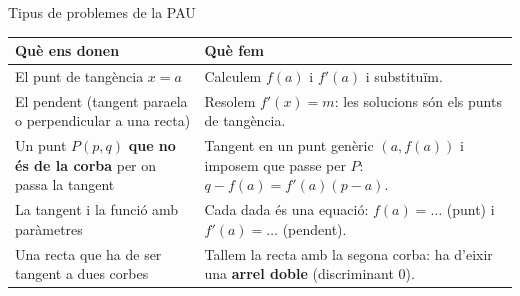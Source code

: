 \documentclass[11pt,a4paper]{article}
\begin{document}
\begin{fmdef}{Tipus de problemes de la PAU}
\begin{center}\renewcommand{\arraystretch}{1.5}\small\begin{tabularx}{\linewidth}{>{\raggedright\arraybackslash}p{5.5cm}>{\raggedright\arraybackslash}X}\toprule
\textbf{Què ens donen} & \textbf{Què fem}\\\midrule
El punt de tangència $x=a$ & Calculem $f(a)$ i $f'(a)$ i substituïm.\\[3pt]
El pendent (tangent para\lgem{}ela o perpendicular a una recta) & Resolem $f'(x)=m$: les solucions són els punts de tangència.\\[3pt]
Un punt $P(p,q)$ \textbf{que no és de la corba} per on passa la tangent & Tangent en un punt genèric $(a,f(a))$ i imposem que passe per $P$: $q-f(a)=f'(a)(p-a)$.\\[3pt]
La tangent i la funció amb paràmetres & Cada dada és una equació: $f(a)=\dots$ (punt) i $f'(a)=\dots$ (pendent).\\[3pt]
Una recta que ha de ser tangent a dues corbes & Tallem la recta amb la segona corba: ha d'eixir una \textbf{arrel doble} (discriminant 0).\\[3pt]
\bottomrule\end{tabularx}\end{center}
\end{fmdef}
\end{document}
